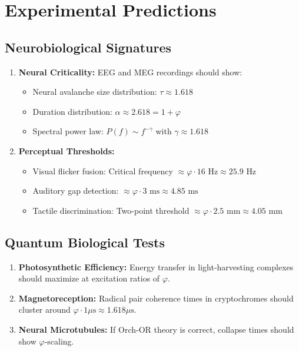 \documentclass[14pt, a4paper]{extarticle}
\begin{document}
\section{Experimental Predictions}

\subsection{Neurobiological Signatures}

\begin{enumerate}
\item \textbf{Neural Criticality:} EEG and MEG recordings should show:
\begin{itemize}
\item Neural avalanche size distribution: $\tau \approx 1.618$
\item Duration distribution: $\alpha \approx 2.618 = 1 + \varphi$
\item Spectral power law: $P(f) \sim f^{-\gamma}$ with $\gamma \approx 1.618$
\end{itemize}

\item \textbf{Perceptual Thresholds:}
\begin{itemize}
\item Visual flicker fusion: Critical frequency $\approx \varphi \cdot 16 \text{ Hz} \approx 25.9 \text{ Hz}$
\item Auditory gap detection: $\approx \varphi \cdot 3 \text{ ms} \approx 4.85 \text{ ms}$
\item Tactile discrimination: Two-point threshold $\approx \varphi \cdot 2.5 \text{ mm} \approx 4.05 \text{ mm}$
\end{itemize}
\end{enumerate}

\subsection{Quantum Biological Tests}

\begin{enumerate}
\item \textbf{Photosynthetic Efficiency:} Energy transfer in light-harvesting complexes should maximize at excitation ratios of $\varphi$.

\item \textbf{Magnetoreception:} Radical pair coherence times in cryptochromes should cluster around $\varphi \cdot 1 \mu\text{s} \approx 1.618 \mu\text{s}$.

\item \textbf{Neural Microtubules:} If Orch-OR theory is correct, collapse times should show $\varphi$-scaling.
\end{enumerate}
\end{document}
